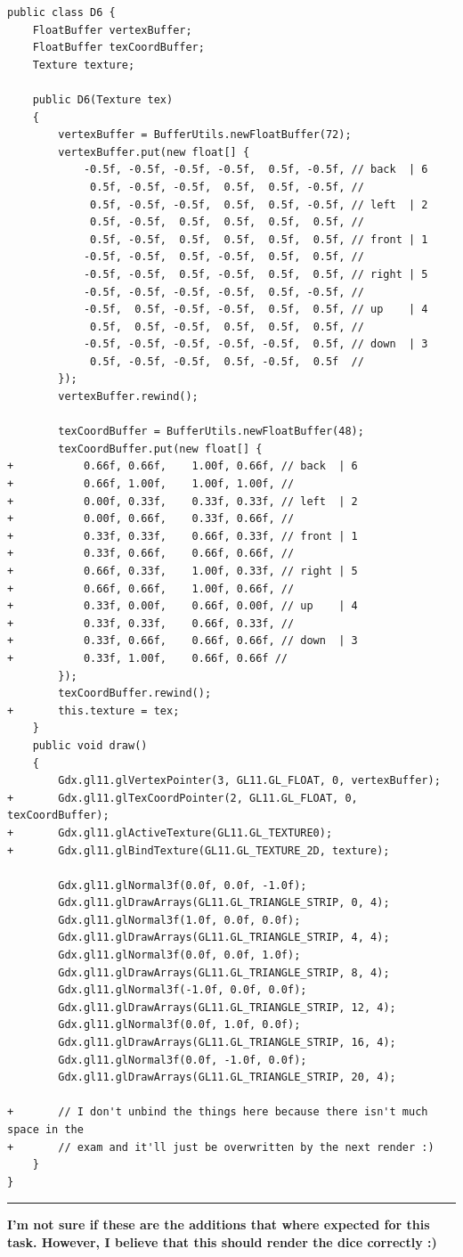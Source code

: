 \footnotesize
\begin{verbatim}
public class D6 {
    FloatBuffer vertexBuffer;
    FloatBuffer texCoordBuffer;
    Texture texture;

    public D6(Texture tex)
    {
        vertexBuffer = BufferUtils.newFloatBuffer(72);
        vertexBuffer.put(new float[] {
            -0.5f, -0.5f, -0.5f, -0.5f,  0.5f, -0.5f, // back  | 6
             0.5f, -0.5f, -0.5f,  0.5f,  0.5f, -0.5f, //
             0.5f, -0.5f, -0.5f,  0.5f,  0.5f, -0.5f, // left  | 2
             0.5f, -0.5f,  0.5f,  0.5f,  0.5f,  0.5f, //
             0.5f, -0.5f,  0.5f,  0.5f,  0.5f,  0.5f, // front | 1
            -0.5f, -0.5f,  0.5f, -0.5f,  0.5f,  0.5f, //
            -0.5f, -0.5f,  0.5f, -0.5f,  0.5f,  0.5f, // right | 5
            -0.5f, -0.5f, -0.5f, -0.5f,  0.5f, -0.5f, //
            -0.5f,  0.5f, -0.5f, -0.5f,  0.5f,  0.5f, // up    | 4
             0.5f,  0.5f, -0.5f,  0.5f,  0.5f,  0.5f, //
            -0.5f, -0.5f, -0.5f, -0.5f, -0.5f,  0.5f, // down  | 3
             0.5f, -0.5f, -0.5f,  0.5f, -0.5f,  0.5f  //
        });
        vertexBuffer.rewind();

        texCoordBuffer = BufferUtils.newFloatBuffer(48);
        texCoordBuffer.put(new float[] {
+           0.66f, 0.66f,    1.00f, 0.66f, // back  | 6
+           0.66f, 1.00f,    1.00f, 1.00f, //
+           0.00f, 0.33f,    0.33f, 0.33f, // left  | 2
+           0.00f, 0.66f,    0.33f, 0.66f, //
+           0.33f, 0.33f,    0.66f, 0.33f, // front | 1
+           0.33f, 0.66f,    0.66f, 0.66f, //
+           0.66f, 0.33f,    1.00f, 0.33f, // right | 5
+           0.66f, 0.66f,    1.00f, 0.66f, //
+           0.33f, 0.00f,    0.66f, 0.00f, // up    | 4
+           0.33f, 0.33f,    0.66f, 0.33f, //
+           0.33f, 0.66f,    0.66f, 0.66f, // down  | 3
+           0.33f, 1.00f,    0.66f, 0.66f //
        });
        texCoordBuffer.rewind();
+       this.texture = tex;
    }
    public void draw()
    {
        Gdx.gl11.glVertexPointer(3, GL11.GL_FLOAT, 0, vertexBuffer);
+       Gdx.gl11.glTexCoordPointer(2, GL11.GL_FLOAT, 0, texCoordBuffer);
+       Gdx.gl11.glActiveTexture(GL11.GL_TEXTURE0);
+       Gdx.gl11.glBindTexture(GL11.GL_TEXTURE_2D, texture);

        Gdx.gl11.glNormal3f(0.0f, 0.0f, -1.0f);
        Gdx.gl11.glDrawArrays(GL11.GL_TRIANGLE_STRIP, 0, 4);
        Gdx.gl11.glNormal3f(1.0f, 0.0f, 0.0f);
        Gdx.gl11.glDrawArrays(GL11.GL_TRIANGLE_STRIP, 4, 4);
        Gdx.gl11.glNormal3f(0.0f, 0.0f, 1.0f);
        Gdx.gl11.glDrawArrays(GL11.GL_TRIANGLE_STRIP, 8, 4);
        Gdx.gl11.glNormal3f(-1.0f, 0.0f, 0.0f);
        Gdx.gl11.glDrawArrays(GL11.GL_TRIANGLE_STRIP, 12, 4);
        Gdx.gl11.glNormal3f(0.0f, 1.0f, 0.0f);
        Gdx.gl11.glDrawArrays(GL11.GL_TRIANGLE_STRIP, 16, 4);
        Gdx.gl11.glNormal3f(0.0f, -1.0f, 0.0f);
        Gdx.gl11.glDrawArrays(GL11.GL_TRIANGLE_STRIP, 20, 4);

+       // I don't unbind the things here because there isn't much space in the 
+       // exam and it'll just be overwritten by the next render :)
    }
}
\end{verbatim}
\normalsize

\rule{\textwidth}{0.2mm}

\textbf{I'm not sure if these are the additions that where expected for this task. However, I believe that this should render the dice correctly :)}

\newpage